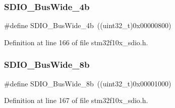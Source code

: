 \subsubsection{\texorpdfstring{S\+D\+I\+O\+\_\+\+Bus\+Wide\+\_\+4b}{SDIO\_BusWide\_4b}}
{\footnotesize\ttfamily \#define S\+D\+I\+O\+\_\+\+Bus\+Wide\+\_\+4b~((uint32\+\_\+t)0x00000800)}



Definition at line 166 of file stm32f10x\+\_\+sdio.\+h.

\mbox{\label{group___s_d_i_o___bus___wide_ga4d864f5c4e1af298146afc1d680081e9}} 
\subsubsection{\texorpdfstring{S\+D\+I\+O\+\_\+\+Bus\+Wide\+\_\+8b}{SDIO\_BusWide\_8b}}
{\footnotesize\ttfamily \#define S\+D\+I\+O\+\_\+\+Bus\+Wide\+\_\+8b~((uint32\+\_\+t)0x00001000)}



Definition at line 167 of file stm32f10x\+\_\+sdio.\+h.

